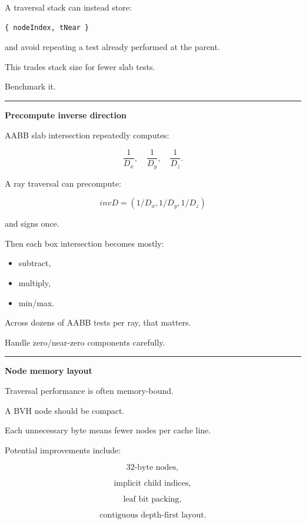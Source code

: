 A traversal stack can instead store:

\begin{verbatim}
{ nodeIndex, tNear }
\end{verbatim}

and avoid repeating a test already performed at the parent.

This trades stack size for fewer slab tests.

Benchmark it.

\begin{center}\rule{0.5\linewidth}{0.5pt}\end{center}

\textbf{Precompute inverse direction}

AABB slab intersection repeatedly computes:

\[
\frac1{D_x},
\quad
\frac1{D_y},
\quad
\frac1{D_z}.
\]

A ray traversal can precompute:

\[
\boxed{
invD=
(1/D_x,1/D_y,1/D_z)
}
\]

and signs once.

Then each box intersection becomes mostly:

\begin{itemize}
\tightlist
\item
  subtract,
\item
  multiply,
\item
  min/max.
\end{itemize}

Across dozens of AABB tests per ray, that matters.

Handle zero/near-zero components carefully.

\begin{center}\rule{0.5\linewidth}{0.5pt}\end{center}

\textbf{Node memory layout}

Traversal performance is often memory-bound.

A BVH node should be compact.

Each unnecessary byte means fewer nodes per cache line.

Potential improvements include:

\[
\text{32-byte nodes},
\]

\[
\text{implicit child indices},
\]

\[
\text{leaf bit packing},
\]

\[
\text{contiguous depth-first layout}.
\]

